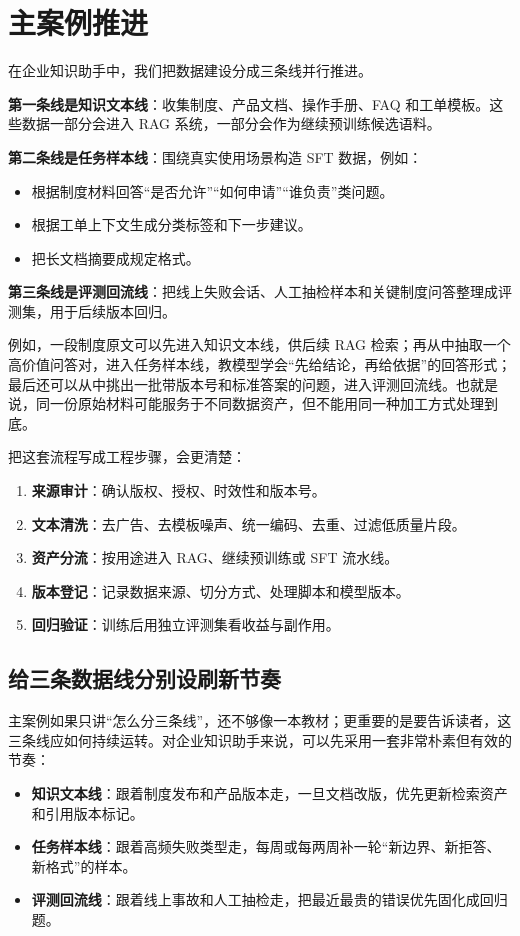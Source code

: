 \section{主案例推进}
在企业知识助手中，我们把数据建设分成三条线并行推进。

\textbf{第一条线是知识文本线}：收集制度、产品文档、操作手册、FAQ 和工单模板。这些数据一部分会进入 RAG 系统，一部分会作为继续预训练候选语料。

\textbf{第二条线是任务样本线}：围绕真实使用场景构造 SFT 数据，例如：
\begin{itemize}
  \item 根据制度材料回答“是否允许”“如何申请”“谁负责”类问题。
  \item 根据工单上下文生成分类标签和下一步建议。
  \item 把长文档摘要成规定格式。
\end{itemize}

\textbf{第三条线是评测回流线}：把线上失败会话、人工抽检样本和关键制度问答整理成评测集，用于后续版本回归。

例如，一段制度原文可以先进入知识文本线，供后续 RAG 检索；再从中抽取一个高价值问答对，进入任务样本线，教模型学会“先给结论，再给依据”的回答形式；最后还可以从中挑出一批带版本号和标准答案的问题，进入评测回流线。也就是说，同一份原始材料可能服务于不同数据资产，但不能用同一种加工方式处理到底。

把这套流程写成工程步骤，会更清楚：
\begin{enumerate}
  \item \textbf{来源审计}：确认版权、授权、时效性和版本号。
  \item \textbf{文本清洗}：去广告、去模板噪声、统一编码、去重、过滤低质量片段。
  \item \textbf{资产分流}：按用途进入 RAG、继续预训练或 SFT 流水线。
  \item \textbf{版本登记}：记录数据来源、切分方式、处理脚本和模型版本。
  \item \textbf{回归验证}：训练后用独立评测集看收益与副作用。
\end{enumerate}

\subsection{给三条数据线分别设刷新节奏}
主案例如果只讲“怎么分三条线”，还不够像一本教材；更重要的是要告诉读者，这三条线应如何持续运转。对企业知识助手来说，可以先采用一套非常朴素但有效的节奏：
\begin{itemize}
  \item \textbf{知识文本线}：跟着制度发布和产品版本走，一旦文档改版，优先更新检索资产和引用版本标记。
  \item \textbf{任务样本线}：跟着高频失败类型走，每周或每两周补一轮“新边界、新拒答、新格式”的样本。
  \item \textbf{评测回流线}：跟着线上事故和人工抽检走，把最近最贵的错误优先固化成回归题。
\end{itemize}

